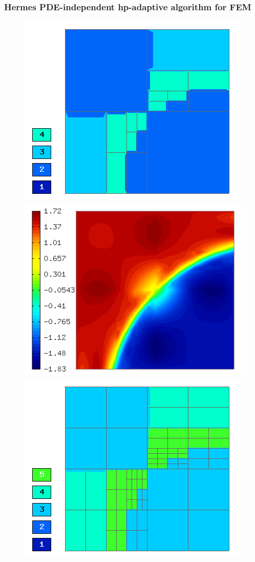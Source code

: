 \documentclass{beamer}
\begin{document}
\begin{frame}
\frametitle{Hermes PDE-independent hp-adaptive algorithm for FEM}
\begin{center}
\begin{figure}[t]
\includegraphics[width=0.42\textheight]{refsln/screen005.png}
\includegraphics[width=0.42\textheight]{refsln/screen004.png}
\includegraphics[width=0.42\textheight]{refsln/screen006.png}
\end{figure}
\end{center}
\vspace{43mm}
\end{frame}
\end{document}
